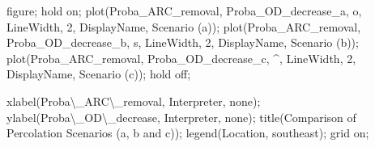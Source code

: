 \documentclass[
  letterpaper,
  DIV=11,
  numbers=noendperiod]{scrartcl}
\newenvironment{Shaded}{\begin{snugshade}}{\end{snugshade}}
\newcommand{\FloatTok}[1]{\textcolor[rgb]{0.68,0.00,0.00}{#1}}
\newcommand{\NormalTok}[1]{\textcolor[rgb]{0.00,0.23,0.31}{#1}}
\newcommand{\OperatorTok}[1]{\textcolor[rgb]{0.37,0.37,0.37}{#1}}
\newcommand{\SpecialStringTok}[1]{\textcolor[rgb]{0.13,0.47,0.30}{#1}}
\newcommand{\VariableTok}[1]{\textcolor[rgb]{0.07,0.07,0.07}{#1}}
\begin{document}
\begin{Shaded}
\begin{Highlighting}[]
\VariableTok{figure}\OperatorTok{;}
\VariableTok{hold} \VariableTok{on}\OperatorTok{;}
\VariableTok{plot}\NormalTok{(}\VariableTok{Proba\_ARC\_removal}\OperatorTok{,} \VariableTok{Proba\_OD\_decrease\_a}\OperatorTok{,} \SpecialStringTok{\textquotesingle{}{-}o\textquotesingle{}}\OperatorTok{,} \SpecialStringTok{\textquotesingle{}LineWidth\textquotesingle{}}\OperatorTok{,} \FloatTok{2}\OperatorTok{,} \SpecialStringTok{\textquotesingle{}DisplayName\textquotesingle{}}\OperatorTok{,} \SpecialStringTok{\textquotesingle{}Scenario (a)\textquotesingle{}}\NormalTok{)}\OperatorTok{;}
\VariableTok{plot}\NormalTok{(}\VariableTok{Proba\_ARC\_removal}\OperatorTok{,} \VariableTok{Proba\_OD\_decrease\_b}\OperatorTok{,} \SpecialStringTok{\textquotesingle{}{-}s\textquotesingle{}}\OperatorTok{,} \SpecialStringTok{\textquotesingle{}LineWidth\textquotesingle{}}\OperatorTok{,} \FloatTok{2}\OperatorTok{,} \SpecialStringTok{\textquotesingle{}DisplayName\textquotesingle{}}\OperatorTok{,} \SpecialStringTok{\textquotesingle{}Scenario (b)\textquotesingle{}}\NormalTok{)}\OperatorTok{;}
\VariableTok{plot}\NormalTok{(}\VariableTok{Proba\_ARC\_removal}\OperatorTok{,} \VariableTok{Proba\_OD\_decrease\_c}\OperatorTok{,} \SpecialStringTok{\textquotesingle{}{-}\^{}\textquotesingle{}}\OperatorTok{,} \SpecialStringTok{\textquotesingle{}LineWidth\textquotesingle{}}\OperatorTok{,} \FloatTok{2}\OperatorTok{,} \SpecialStringTok{\textquotesingle{}DisplayName\textquotesingle{}}\OperatorTok{,} \SpecialStringTok{\textquotesingle{}Scenario (c)\textquotesingle{}}\NormalTok{)}\OperatorTok{;}
\VariableTok{hold} \VariableTok{off}\OperatorTok{;}

\VariableTok{xlabel}\NormalTok{(}\SpecialStringTok{\textquotesingle{}Proba\textbackslash{}\_ARC\textbackslash{}\_removal\textquotesingle{}}\OperatorTok{,} \SpecialStringTok{\textquotesingle{}Interpreter\textquotesingle{}}\OperatorTok{,} \SpecialStringTok{\textquotesingle{}none\textquotesingle{}}\NormalTok{)}\OperatorTok{;}
\VariableTok{ylabel}\NormalTok{(}\SpecialStringTok{\textquotesingle{}Proba\textbackslash{}\_OD\textbackslash{}\_decrease\textquotesingle{}}\OperatorTok{,} \SpecialStringTok{\textquotesingle{}Interpreter\textquotesingle{}}\OperatorTok{,} \SpecialStringTok{\textquotesingle{}none\textquotesingle{}}\NormalTok{)}\OperatorTok{;}
\VariableTok{title}\NormalTok{(}\SpecialStringTok{\textquotesingle{}Comparison of Percolation Scenarios (a, b and c)\textquotesingle{}}\NormalTok{)}\OperatorTok{;}
\VariableTok{legend}\NormalTok{(}\SpecialStringTok{\textquotesingle{}Location\textquotesingle{}}\OperatorTok{,} \SpecialStringTok{\textquotesingle{}southeast\textquotesingle{}}\NormalTok{)}\OperatorTok{;}
\VariableTok{grid} \VariableTok{on}\OperatorTok{;}
\end{Highlighting}
\end{Shaded}
\end{document}
